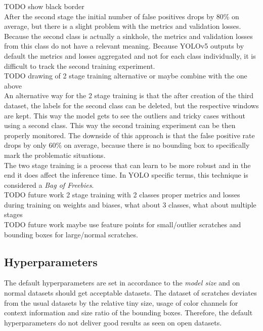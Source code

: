 TODO show black border \\
After the second stage the initial number of false positives drops by 80\% on average, but there is a slight problem with the metrics and validation losses. Because the second class is actually a sinkhole, the metrics and validation losses from this class do not have a relevant meaning. Because YOLOv5 outputs by default the metrics and losses aggregated and not for each class individually, it is difficult to track the second training experiment. \\
TODO drawing of 2 stage training alternative or maybe combine with the one above\\
An alternative way for the 2 stage training is that the after creation of the third dataset, the labels for the second class can be deleted, but the respective windows are kept. This way the model gets to see the outliers and tricky cases without using a second class. This way the second training experiment can be then properly monitored. The downside of this approach is that the false positive rate drops by only 60\% on average, because there is no bounding box to specifically mark the problematic situations. \\
The two stage training is a process that can learn to be more robust and in the end it does affect the inference time. In YOLO specific terms, this technique is considered a \textit{Bag of Freebies}. \\

TODO future work 2 stage training with 2 classes proper metrics and losses during training on weights and biases, what about 3 classes, what about multiple stages \\
TODO future work maybe use feature points for small/outlier scratches and bounding boxes for large/normal scratches.


\subsection{Hyperparameters}
The default hyperparameters are set in accordance to the \textit{model size} and on normal datasets should get acceptable datasets. The dataset of scratches deviates from the usual datasets by the relative tiny size, usage of color channels for context information and size ratio of the bounding boxes. Therefore, the default hyperparameters do not deliver good results as seen on open datasets. \\

